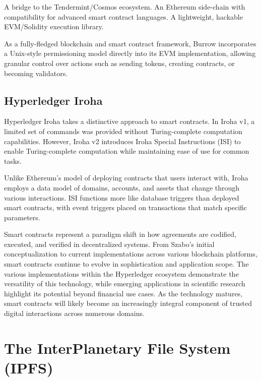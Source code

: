 \documentclass[final]{rc-book-2.14}
\begin{document}
A bridge to the Tendermint/Cosmos ecosystem. An Ethereum side-chain with compatibility for advanced smart contract languages. A lightweight, hackable EVM/Solidity execution library\cite{hyperledger2019burrow}.

As a fully-fledged blockchain and smart contract framework, Burrow incorporates a Unix-style permissioning model directly into its EVM implementation, allowing granular control over actions such as sending tokens, creating contracts, or becoming validators\cite{monax2020burrow}.

\subsection{Hyperledger Iroha}

Hyperledger Iroha takes a distinctive approach to smart contracts. In Iroha v1, a limited set of commands was provided without Turing-complete computation capabilities. However, Iroha v2 introduces Iroha Special Instructions (ISI) to enable Turing-complete computation while maintaining ease of use for common tasks.

Unlike Ethereum's model of deploying contracts that users interact with, Iroha employs a data model of domains, accounts, and assets that change through various interactions. ISI functions more like database triggers than deployed smart contracts, with event triggers placed on transactions that match specific parameters\cite{hyperledger2020iroha}.

Smart contracts represent a paradigm shift in how agreements are codified, executed, and verified in decentralized systems. From Szabo's initial conceptualization to current implementations across various blockchain platforms, smart contracts continue to evolve in sophistication and application scope. The various implementations within the Hyperledger ecosystem demonstrate the versatility of this technology, while emerging applications in scientific research highlight its potential beyond financial use cases. As the technology matures, smart contracts will likely become an increasingly integral component of trusted digital interactions across numerous domains.



\section{The InterPlanetary File System (IPFS)}
\end{document}
